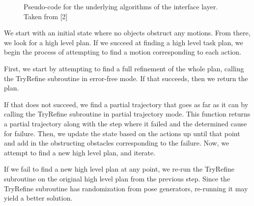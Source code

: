 \documentclass[12pt]{article}
\begin{document}
\begin{figure}[t]
	\centering
	\qquad
	\caption{Pseudo-code for the underlying algorithms of the interface layer. Taken from [2]\label{fig:algorithms}}
\end{figure}

We start with an initial state where no objects obstruct any motions.  
From there, we look for a high level plan.  
If we succeed at finding a high level task plan, we begin the process of attempting to find a motion corresponding to each action.

First, we start by attempting to find a full refinement of the whole plan, calling the TryRefine subroutine in error-free mode.  
If that succeeds, then we return the plan.  

If that does not succeed, we find a partial trajectory that goes as far as it can by calling the TryRefine subroutine in partial trajectory mode.  
This function returns a partial trajectory along with the step where it failed and the determined cause for failure.  
Then, we update the state based on the actions up until that point and add in the obstructing obstacles corresponding to the failure.  
Now, we attempt to find a new high level plan, and iterate.  

If we fail to find a new high level plan at any point, we re-run the TryRefine subroutine on the original high level plan from the previous step.  
Since the TryRefine subroutine has randomization from pose generators, re-running it may yield a better solution. 
\end{document}
